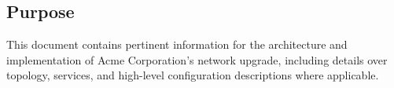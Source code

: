 \subsection{Purpose}
This document contains pertinent information for the architecture and
implementation of Acme Corporation's network upgrade, including details over 
topology, services, and high-level configuration descriptions where applicable.
